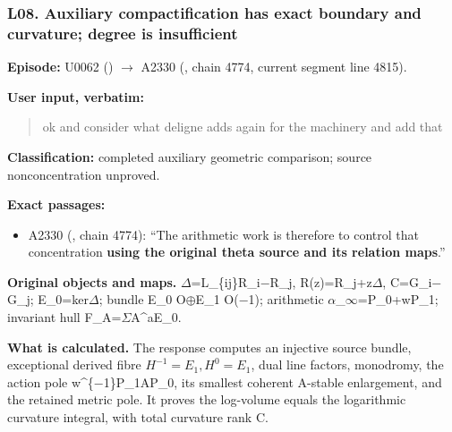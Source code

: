 \subsubsection{L08. Auxiliary compactification has exact boundary and
curvature; degree is
insufficient}\label{l08.-auxiliary-compactification-has-exact-boundary-and-curvature-degree-is-insufficient}

\textbf{Episode:} U0062
(\protect{})
\allowbreak{}\ensuremath{→}\allowbreak{} A2330
(\protect{}, chain 4774,
current segment line 4815).

\textbf{User input, verbatim:}

\begin{quote}
ok and consider what deligne adds again for the machinery and add that
\end{quote}

\textbf{Classification:} completed auxiliary geometric comparison;
source nonconcentration unproved.

\textbf{Exact passages:}

\begin{itemize}
\tightlist
\item
  A2330 (\protect{}, chain
  4774): ``The arithmetic work is therefore to control that
  concentration \textbf{using the original theta source and its relation
  maps}.''
\end{itemize}

\textbf{Original objects and maps.}
\allowbreak{}\ensuremath{Δ}\allowbreak{}=L\_\{ij\}R\_i\allowbreak{}\ensuremath{−}\allowbreak{}R\_j,
R(z)=R\_j+z\allowbreak{}\ensuremath{Δ}\allowbreak{},
C=G\_i\allowbreak{}\ensuremath{−}\allowbreak{}G\_j;
E\_0=ker\allowbreak{}\ensuremath{Δ}\allowbreak{}; bundle E\_0
O\allowbreak{}\ensuremath{⊕}\allowbreak{}E\_1
O(\allowbreak{}\ensuremath{−}\allowbreak{}1); arithmetic
\allowbreak{}\ensuremath{α}\allowbreak{}\_\allowbreak{}\ensuremath{∞}\allowbreak{}=P\_0+wP\_1;
invariant hull
F\_A=\allowbreak{}\ensuremath{Σ}\allowbreak{}A\textasciicircum{}aE\_0.

\textbf{What is calculated.} The response computes an injective source
bundle, exceptional derived fibre \(H^{-1}=E_1,H^0=E_1\), dual line
factors, monodromy, the action pole
w\textasciicircum{}\{\allowbreak{}\ensuremath{−}\allowbreak{}1\}P\_1AP\_0,
its smallest coherent A-stable enlargement, and the retained metric
pole. It proves the log-volume equals the logarithmic curvature
integral, with total curvature rank C.

